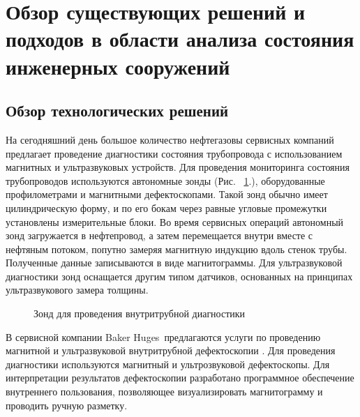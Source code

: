 \documentclass[a4paper,article,14pt]{extarticle}
\begin{document}
\pagebreak
\section{Обзор существующих решений и подходов в области анализа состояния инженерных сооружений}

\subsection{Обзор технологических решений}

На сегодняшний день большое количество нефтегазовы сервисных компаний предлагает проведение диагностики состояния 
трубопровода с использованием магнитных и ультразвуковых устройств. Для проведения мониторинга состояния трубопроводов 
используются автономные зонды (Рис. ~\ref{image1}.), оборудованные профилометрами и магнитными дефектоскопами. Такой зонд обычно имеет 
цилиндрическую форму, и по его бокам через равные угловые промежутки установлены измерительные блоки. Во время сервисных 
операций автономный зонд загружается в нефтепровод, а затем перемещается внутри вместе с нефтяным потоком, попутно замеряя 
магнитную индукцию вдоль стенок трубы. Полученные данные записываются в виде магнитограммы. Для ультразвуковой диагностики зонд 
оснащается другим типом датчиков, основанных на принципах ультразвукового замера толщины.

\begin{figure}[ht]
    \begin{center}
    
    \caption{
    \label{image1}
    Зонд для проведения внутритрубной диагностики}
    \end {center}
\end {figure}

В сервисной компании \flqq Baker Huges\frqq\, предлагаются услуги по проведению магнитной и ультразвуковой внутритрубной дефектоскопии \cite{s2}.
Для проведения диагностики используются магнитный и ультрозвуковой дефектоскопы. Для интерпретации результатов дефектоскопии 
разработано программное обеспечение внутреннего пользования, позволяющее визуализировать магнитограмму и проводить ручную разметку.
\end{document}
